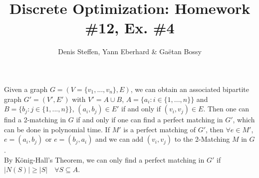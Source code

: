 \documentclass[a4paper,11pt,french]{article}
\title{Discrete Optimization: Homework \#12, Ex. \#4}
\author{Denis Steffen, Yann Eberhard \& Gaëtan Bossy}
\begin{document}
    
    \maketitle
Given a graph $G=(V=\{v_1,...,v_n\},E)$, we can obtain an associated bipartite graph $G'=(V',E')$ with $V'=A\cup B$, $A=\{a_i : i\in \{1,...,n\}\}$ and $B=\{ b_j  : j \in \{1,...,n\}\}$, $(a_i,b_j)\in E'$ if and only if $(v_i,v_j)\in E$. Then one can find a 2-matching in $G$ if and only if one can find a perfect matching in $G'$, which can be done in polynomial time. If $M'$ is a perfect matching of $G'$, then $\forall e\in M'$, $e=(a_i,b_j)$ or $e=(b_j,a_i)$ and we can add $(v_i,v_j)$ to the 2-Matching $M$ in $G$.\\

By König-Hall's Theorem, we can only find a perfect matching in $G'$ if $|N(S)|\geq|S|\quad \forall S\subseteq A$.
\end{document}
